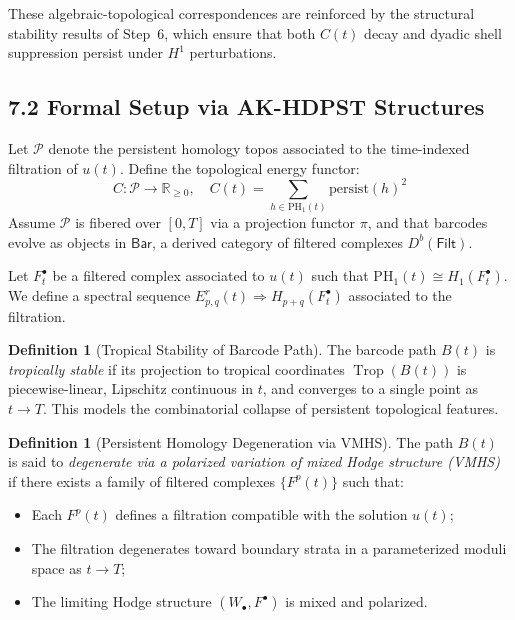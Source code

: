 \documentclass[11pt]{article}
\theoremstyle{definition}
\newtheorem{definition}[theorem]{Definition}
\begin{document}
These algebraic-topological correspondences are reinforced by the structural stability results of Step~6, which ensure that both $C(t)$ decay and dyadic shell suppression persist under $H^1$ perturbations.

\subsection*{7.2 Formal Setup via AK-HDPST Structures}

Let $\mathcal{P}$ denote the persistent homology topos associated to the time-indexed filtration of $u(t)$. Define the topological energy functor:
\[
C: \mathcal{P} \to \mathbb{R}_{\geq 0}, \quad C(t) = \sum_{h \in \mathrm{PH}_1(t)} \text{persist}(h)^2
\]
Assume $\mathcal{P}$ is fibered over $[0,T]$ via a projection functor $\pi$, and that barcodes evolve as objects in $\mathsf{Bar}$, a derived category of filtered complexes $D^b(\mathsf{Filt})$.

Let $F^\bullet_t$ be a filtered complex associated to $u(t)$ such that $\mathrm{PH}_1(t) \cong H_1(F^\bullet_t)$. We define a spectral sequence $E^r_{p,q}(t) \Rightarrow H_{p+q}(F^\bullet_t)$ associated to the filtration.

\begin{definition}[Tropical Stability of Barcode Path]
The barcode path $B(t)$ is \emph{tropically stable} if its projection to tropical coordinates $\operatorname{Trop}(B(t))$ is piecewise-linear, Lipschitz continuous in $t$, and converges to a single point as $t \to T$. This models the combinatorial collapse of persistent topological features.
\end{definition}

\begin{definition}[Persistent Homology Degeneration via VMHS]
The path $B(t)$ is said to \emph{degenerate via a polarized variation of mixed Hodge structure (VMHS)} if there exists a family of filtered complexes $\{F^p(t)\}$ such that:
\begin{itemize}
  \item Each $F^p(t)$ defines a filtration compatible with the solution $u(t)$;
  \item The filtration degenerates toward boundary strata in a parameterized moduli space as $t \to T$;
  \item The limiting Hodge structure $(W_\bullet, F^\bullet)$ is mixed and polarized.
\end{itemize}
\end{definition}
\end{document}
